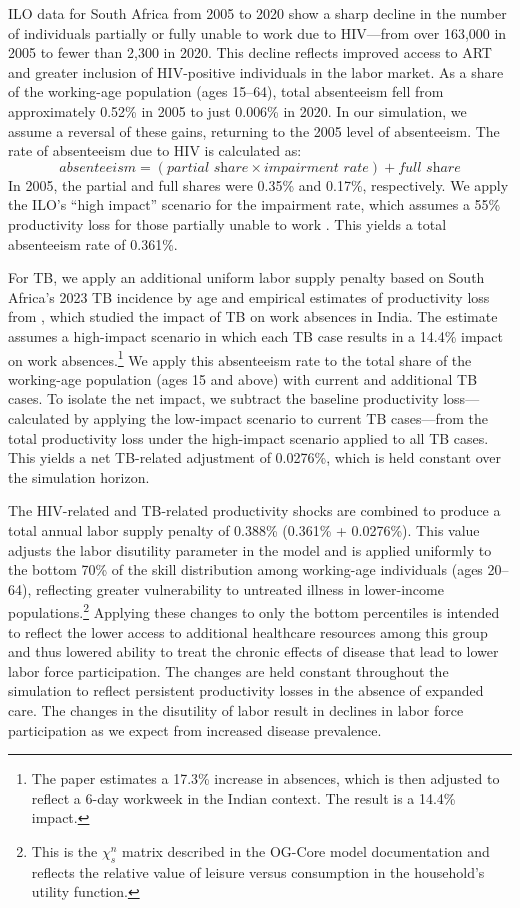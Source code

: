 \documentclass[letterpaper,12pt]{article}
\theoremstyle{definition}
\begin{document}
\begin{spacing}{1.5}
ILO data for South Africa from 2005 to 2020 show a sharp decline in the number of individuals partially or fully unable to work due to HIV---from over 163,000 in 2005 to fewer than 2,300 in 2020. This decline reflects improved access to ART and greater inclusion of HIV-positive individuals in the labor market. As a share of the working-age population (ages 15--64), total absenteeism fell from approximately 0.52\% in 2005 to just 0.006\% in 2020. In our simulation, we assume a reversal of these gains, returning to the 2005 level of absenteeism. The rate of absenteeism due to HIV is calculated as:
\[
\textit{absenteeism} = (\textit{partial share} \times \textit{impairment rate}) + \textit{full share}
\]
In 2005, the partial and full shares were 0.35\% and 0.17\%, respectively. We apply the ILO’s ``high impact'' scenario for the impairment rate, which assumes a 55\% productivity loss for those partially unable to work \citep{ILO2018}. This yields a total absenteeism rate of 0.361\%.

For TB, we apply an additional uniform labor supply penalty based on South Africa's 2023 TB incidence by age and empirical estimates of productivity loss from \citet{Keogh2024}, which studied the impact of TB on work absences in India. The estimate assumes a high-impact scenario in which each TB case results in a 14.4\% impact on work absences.\footnote{The paper estimates a 17.3\% increase in absences, which is then adjusted to reflect a 6-day workweek in the Indian context. The result is a 14.4\% impact.} We apply this absenteeism rate to the total share of the working-age population (ages 15 and above) with current and additional TB cases. To isolate the net impact, we subtract the baseline productivity loss—calculated by applying the low-impact scenario to current TB cases—from the total productivity loss under the high-impact scenario applied to all TB cases. This yields a net TB-related adjustment of 0.0276\%, which is held constant over the simulation horizon.

The HIV-related and TB-related productivity shocks are combined to produce a total annual labor supply penalty of 0.388\% (0.361\% + 0.0276\%). This value adjusts the labor disutility parameter in the model and is applied uniformly to the bottom 70\% of the skill distribution among working-age individuals (ages 20–64), reflecting greater vulnerability to untreated illness in lower-income populations.\footnote{This is the $\chi^n_s$ matrix described in the OG-Core model documentation and reflects the relative value of leisure versus consumption in the household's utility function.} Applying these changes to only the bottom percentiles is intended to reflect the lower access to additional healthcare resources among this group and thus lowered ability to treat the chronic effects of disease that lead to lower labor force participation. The changes are held constant throughout the simulation to reflect persistent productivity losses in the absence of expanded care. The changes in the disutility of labor result in declines in labor force participation as we expect from increased disease prevalence.


\end{spacing}
\end{document}
